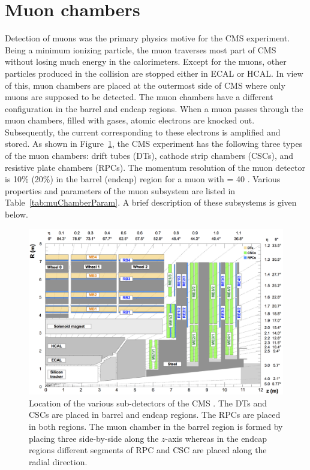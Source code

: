 \section{Muon chambers}
\label{fig1:cms_muon2}
Detection of muons was the primary physics motive for the CMS experiment. Being
a minimum ionizing particle, the muon traverses most part of CMS without
losing much energy in the calorimeters. Except for the muons, other particles
produced in the collision are stopped either in ECAL or HCAL. In view of this,
muon chambers are placed at the outermost side of CMS where only muons are
supposed to be detected. The muon chambers have a different configuration in the
barrel and endcap regions. When a muon passes through the muon chambers, filled
with gases, atomic electrons are knocked out. Subsequently, the current corresponding
to these electrons is amplified and stored. As shown in Figure~\ref{fig:cms_mu},
the CMS experiment has the following three types of the muon chambers: drift tubes (DTs),
cathode strip chambers (CSCs), and resistive plate chambers (RPCs). The momentum resolution of 
the muon detector is 10\% (20\%) in the barrel (endcap) region for a muon with 
\pt = 40 \GeV. Various properties and parameters of the muon subsystem are listed in 
Table~\ref{tab:muChamberParam}. A brief description of these subsystems is given below.
\begin{figure}
\centering
\includegraphics[width=0.75\linewidth]{Experiment/CMS/Image/mu2.png}
\caption{Location of the various sub-detectors of the CMS 
	\cite{Sirunyan:2018fpa}. The DTs and CSCs are placed in barrel and 
	endcap regions. The RPCs are placed in both regions. The muon chamber
	in the barrel region is formed by placing three  side-by-side
	along the $z$-axis whereas in the endcap regions different segments
	of RPC and CSC are placed along the radial direction.}
\label{fig:cms_mu}
\end{figure}
